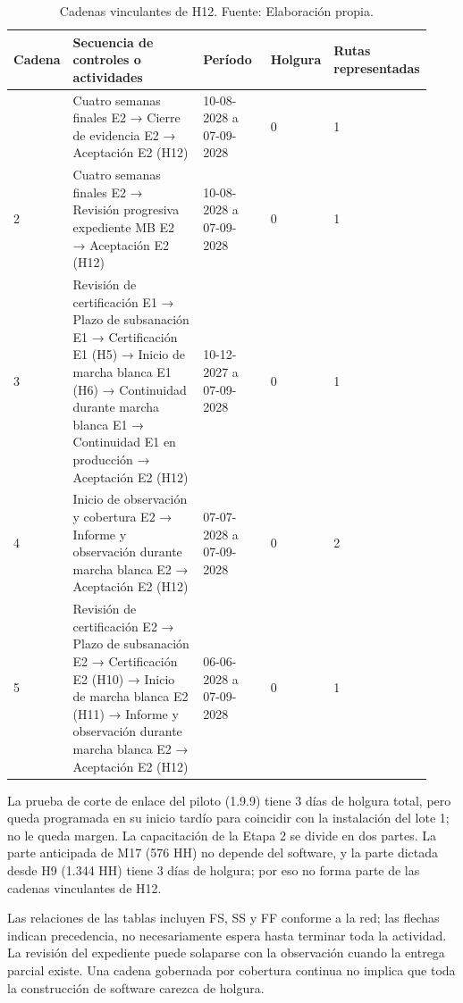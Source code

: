 \documentclass[11pt]{article}
\begin{document}
\begingroup
\small
\begin{longtable}{@{}p{0.07\linewidth}p{0.53\linewidth}p{0.19\linewidth}p{0.06\linewidth}p{0.08\linewidth}@{}}
\caption[Cadenas vinculantes de H12]{Cadenas vinculantes de H12. Fuente: Elaboración propia.}\label{tab:t15-cadenas-H12}\\
\toprule
\textbf{Cadena} & \textbf{Secuencia de controles o actividades} & \textbf{Período} & \textbf{Holgura} & \textbf{Rutas representadas} \\
\midrule
\endhead
\bottomrule
\endlastfoot
1 & Cuatro semanas finales E2 → Cierre de evidencia E2 → Aceptación E2 (H12) & 10-08-2028 a 07-09-2028 & 0 & 1 \\
2 & Cuatro semanas finales E2 → Revisión progresiva expediente MB E2 → Aceptación E2 (H12) & 10-08-2028 a 07-09-2028 & 0 & 1 \\
3 & Revisión de certificación E1 → Plazo de subsanación E1 → Certificación E1 (H5) → Inicio de marcha blanca E1 (H6) → Continuidad durante marcha blanca E1 → Continuidad E1 en producción → Aceptación E2 (H12) & 10-12-2027 a 07-09-2028 & 0 & 1 \\
4 & Inicio de observación y cobertura E2 → Informe y observación durante marcha blanca E2 → Aceptación E2 (H12) & 07-07-2028 a 07-09-2028 & 0 & 2 \\
5 & Revisión de certificación E2 → Plazo de subsanación E2 → Certificación E2 (H10) → Inicio de marcha blanca E2 (H11) → Informe y observación durante marcha blanca E2 → Aceptación E2 (H12) & 06-06-2028 a 07-09-2028 & 0 & 1 \\
\end{longtable}
\endgroup

La prueba de corte de enlace del piloto (1.9.9) tiene 3 días de holgura total, pero queda programada en su inicio tardío para coincidir con la instalación del lote 1; no le queda margen. La capacitación de la Etapa 2 se divide en dos partes. La parte anticipada de M17 (576 HH) no depende del software, y la parte dictada desde H9 (1.344 HH) tiene 3 días de holgura; por eso no forma parte de las cadenas vinculantes de H12.

Las relaciones de las tablas incluyen FS, SS y FF conforme a la red; las flechas indican precedencia, no necesariamente espera hasta terminar toda la actividad. La revisión del expediente puede solaparse con la observación cuando la entrega parcial existe. Una cadena gobernada por cobertura continua no implica que toda la construcción de software carezca de holgura.
\end{document}
